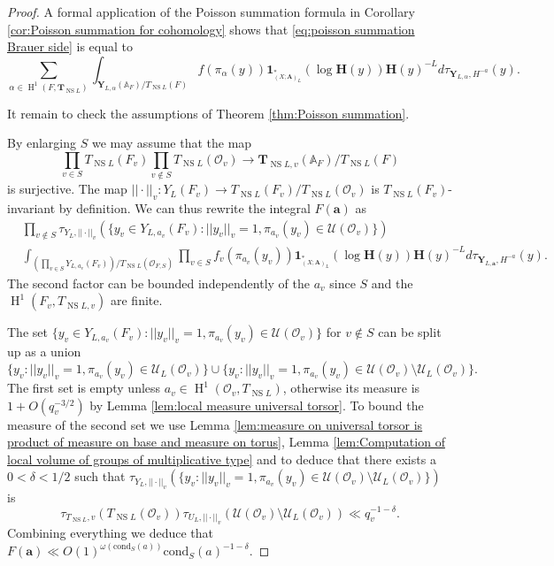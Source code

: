\documentclass[a4paper,11pt,reqno]{amsart}
\newcommand{\A}{\mathbb{A}}
\DeclareMathOperator{\NS}{NS}
\DeclareMathOperator{\Eff}{\overline{Eff}}
\DeclareMathOperator{\HH}{H}
\theoremstyle{definition}
\begin{document}
\begin{proof}
	A formal application of the Poisson summation formula in Corollary \ref{cor:Poisson summation for cohomology} shows that \eqref{eq:poisson summation Brauer side} is equal to 
	\[
	\sum_{\alpha \in \HH^1(F, \mathbf{T}_{\NS L})} \int_{\mathbf{Y}_{L, \alpha}(\A_F)/T_{\NS L}(F)} f(\pi_{\alpha}(y))
	\mathbf{1}_{\Eff_{(X; \mathbf{A})_L}^*}(\log \mathbf{H}(y)) \mathbf{H}(y)^{- L}
	d\tau_{\mathbf{Y}_{L, \alpha}, H^{-a}}(y).
	\]
	
	It remain to check the assumptions of Theorem \ref{thm:Poisson summation}.
	
	By enlarging $S$ we may assume that the map 
	\[
	\prod_{v \in S} T_{\NS L}(F_v) \prod_{v \not \in S} T_{\NS L}(\mathcal{O}_v) \to \mathbf{T}_{\NS L, v}(\A_F)/T_{\NS L}(F)
	\]
	is surjective. The map $||\cdot||_v: Y_L(F_v) \to T_{\NS L}(F_v)/T_{\NS L}(\mathcal{O}_v)$ is $T_{\NS L}(F_v)$-invariant by definition. We can thus rewrite the integral $F(\mathbf{a})$ as 
	\begin{equation*}
		\begin{split}
			&\prod_{v \not \in S} \tau_{Y_L, ||\cdot||_v}(\{y_v \in Y_{L, a_v}(F_v): ||y_v||_v = 1, \pi_{a_v}(y_v) \in \mathcal{U}(\mathcal{O}_v)\})\\
			&\int_{(\prod_{v \in S} Y_{L, a_v}(F_v))/T_{\NS L}(\mathcal{O}_{F, S})} \prod_{v \in S} f_v(\pi_{a_v}(y_v)) 
			\mathbf{1}_{\Eff_{(X; \mathbf{A})_L}^*}(\log \mathbf{H}(y)) \mathbf{H}(y)^{- L}
			d\tau_{\mathbf{Y}_{L, \mathbf{a}}, H^{-a}}(y).
		\end{split}
	\end{equation*}
	The second factor can be bounded independently of the $a_v$ since $S$ and the $\HH^1(F_v, T_{\NS L, v})$ are finite.
	
	The set $\{y_v \in Y_{L, a_v}(F_v): ||y_v||_v = 1, \pi_{a_v}(y_v) \in \mathcal{U}(\mathcal{O}_v)\}$ for $v \not \in S$ can be split up as a union
	\[
	\{y_v: ||y_v||_v = 1, \pi_{a_v}(y_v) \in \mathcal{U}_L(\mathcal{O}_v)\} \cup \{y_v : ||y_v||_v = 1, \pi_{a_v}(y_v) \in \mathcal{U}(\mathcal{O}_v) \setminus \mathcal{U}_L(\mathcal{O}_v) \}.
	\]
	The first set is empty unless $a_v \in \HH^1(\mathcal{O}_v, T_{\NS L})$, otherwise its measure is $1 + O(q_v^{-3/2})$ by Lemma \ref{lem:local measure universal torsor}. To bound the measure of the second set we use Lemma \ref{lem:measure on universal torsor is product of measure on base and measure on torus}, Lemma \ref{lem:Computation of local volume of groups of multiplicative type} and \cite[3.3.8]{Batyrev1998Polarized} to deduce that there exists a $0 < \delta < 1/2$ such that $\tau_{Y_L, ||\cdot||_v}(\{y_v : ||y_v||_v = 1, \pi_{a_v}(y_v) \in \mathcal{U}(\mathcal{O}_v) \setminus \mathcal{U}_L(\mathcal{O}_v)\})$ is
	\[
	\tau_{T_{\NS L}, v}(T_{\NS L}(\mathcal{O}_v)) \tau_{U_L, ||\cdot||_v}(\mathcal{U}(\mathcal{O}_v) \setminus \mathcal{U}_L(\mathcal{O}_v)) \ll q_v^{-1 - \delta}.
	\]
	Combining everything we deduce that 
	$F(\mathbf{a}) \ll O(1)^{\omega(\text{cond}_S(a))} \text{cond}_S(a)^{- 1 - \delta}$.
	

\end{proof}
\end{document}

